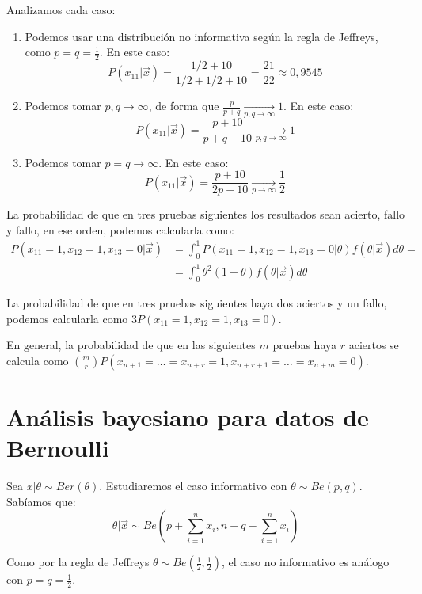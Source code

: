 \begin{example}
    Analizamos cada caso:
    \begin{enumerate}
        \item Podemos usar una distribución no informativa según la regla de Jeffreys, como $p = q = \frac{1}{2}$.
              En este caso:
              $$P(x_{11}|\vec{x}) = \frac{1/2+10}{1/2+1/2+10} = \frac{21}{22} \approx 0,9545$$
        \item Podemos tomar $p, q \to \infty$, de forma que $\frac{p}{p+q} \xrightarrow[p, q \to \infty]{} 1$.
              En este caso:
              $$P(x_{11}|\vec{x}) = \frac{p+10}{p+q+10} \xrightarrow[p, q \to \infty]{} 1$$
        \item Podemos tomar $p = q \to \infty$.
              En este caso:
              $$P(x_{11}|\vec{x}) = \frac{p+10}{2p+10} \xrightarrow[p \to \infty]{} \frac{1}{2}$$
    \end{enumerate}

    La probabilidad de que en tres pruebas siguientes los resultados sean acierto, fallo y fallo, en ese orden, podemos calcularla como:
    \begin{align*}
        P(x_{11} = 1, x_{12} = 1, x_{13} = 0|\vec{x}) & = \int_0^1 P(x_{11} = 1, x_{12} = 1, x_{13} = 0|\theta)f(\theta|\vec{x})d\theta = \\
                                                      & = \int_0^1 \theta^2(1-\theta)f(\theta|\vec{x})d\theta
    \end{align*}

    La probabilidad de que en tres pruebas siguientes haya dos aciertos y un fallo, podemos calcularla como $3P(x_{11} = 1, x_{12} = 1, x_{13} = 0)$.

    En general, la probabilidad de que en las siguientes $m$ pruebas haya $r$ aciertos se calcula como $\binom{m}{r}P(x_{n+1} = \dots = x_{n+r} = 1, x_{n+r+1} = \dots = x_{n+m} = 0)$.
\end{example}

\section{Análisis bayesiano para datos de Bernoulli}
Sea $x|\theta \sim Ber(\theta)$.
Estudiaremos el caso informativo con $\theta \sim Be(p, q)$.
Sabíamos que:
$$\theta|\vec{x} \sim Be\left(p+\sum_{i=1}^n x_i, n+q-\sum_{i=1}^n x_i\right)$$

Como por la regla de Jeffreys $\theta \sim Be\left(\frac{1}{2}, \frac{1}{2}\right)$, el caso no informativo es análogo con $p = q = \frac{1}{2}$.


